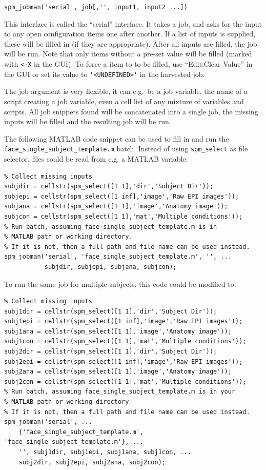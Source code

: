 \verb|spm_jobman('serial', job[,'', input1, input2 ...])|

This interface is called the ``serial'' interface. It takes a job, and asks
for the input to any open configuration items one after another. If a list of
inputs is supplied, these will be filled in (if they are appropriate). After
all inputs are filled, the job will be run. Note that only items 
without a pre-set value will be filled (marked with \verb|<-X| in
the GUI). To force a item to to be filled, use ``Edit:Clear Value''
in the GUI or set its value to \verb|'<UNDEFINED>'| in the harvested job.

The job argument is very flexible, it can e.g.\ be a job variable, the
name of a script creating a job variable, even a cell list of any
mixture of variables and scripts. All job snippets found will be
concatenated into a single job, the missing inputs will be filled and
the resulting job will be run.

The following MATLAB code snippet can be used to fill in and run the
\verb|face_single_subject_template.m| batch. Instead of using
\verb|spm_select| as file selector, files could be read from e.g. a MATLAB
variable: 

\begin{verbatim}
% Collect missing inputs
subjdir = cellstr(spm_select([1 1],'dir','Subject Dir'));
subjepi = cellstr(spm_select([1 inf],'image','Raw EPI images'));
subjana = cellstr(spm_select([1 1],'image','Anatomy image'));
subjcon = cellstr(spm_select([1 1],'mat','Multiple conditions'));
% Run batch, assuming face_single_subject_template.m is in 
% MATLAB path or working directory.
% If it is not, then a full path and file name can be used instead.
spm_jobman('serial', 'face_single_subject_template.m', '', ...
           subjdir, subjepi, subjana, subjcon);
\end{verbatim}

To run the same job for multiple subjects, this code could be modified to:

\begin{verbatim}
% Collect missing inputs
subj1dir = cellstr(spm_select([1 1],'dir','Subject Dir'));
subj1epi = cellstr(spm_select([1 inf],'image','Raw EPI images'));
subj1ana = cellstr(spm_select([1 1],'image','Anatomy image'));
subj1con = cellstr(spm_select([1 1],'mat','Multiple conditions'));
subj2dir = cellstr(spm_select([1 1],'dir','Subject Dir'));
subj2epi = cellstr(spm_select([1 inf],'image','Raw EPI images'));
subj2ana = cellstr(spm_select([1 1],'image','Anatomy image'));
subj2con = cellstr(spm_select([1 1],'mat','Multiple conditions'));
% Run batch, assuming face_single_subject_template.m is in your 
% MATLAB path or working directory
% If it is not, then a full path and file name can be used instead.
spm_jobman('serial', ...
    {'face_single_subject_template.m', 'face_single_subject_template.m'}, ...
    '', subj1dir, subj1epi, subj1ana, subj1con, ...
    subj2dir, subj2epi, subj2ana, subj2con);
\end{verbatim}

